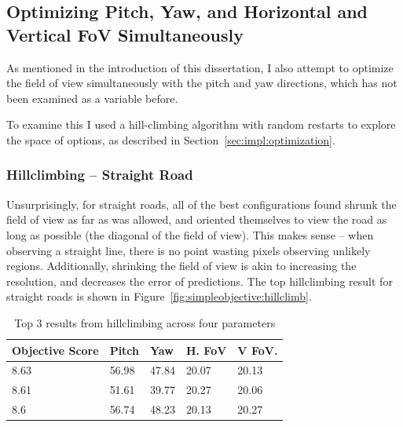 \documentclass[a4paper,12pt,twoside,openright]{report}
\begin{document}


\subsection{Optimizing Pitch, Yaw, and Horizontal and Vertical FoV Simultaneously}

As mentioned in the introduction of this dissertation, I also attempt
to optimize the field of view simultaneously with the pitch and yaw
directions, which has not been examined as a variable before.

To examine this I used a hill-climbing algorithm with random restarts
to explore the space of options, as described in Section~\ref{sec:impl:optimization}.

\subsubsection{Hillclimbing -- Straight Road}

Unsurprisingly, for straight roads, all of the best configurations found
shrunk the field of view as far as was allowed, and oriented themselves to
view the road as long as possible (the diagonal of the field of view). This makes sense -- 
when observing a straight line, there is no point wasting pixels
observing unlikely regions. Additionally, shrinking the field
of view is akin to increasing the resolution, and decreases
the error of predictions. The top hillclimbing result
for straight roads is shown in Figure~\ref{fig:simpleobjective:hillclimb}.

\begin{table}[htb]
    \centering
    \caption[Hillclimbing Top Scorers]{Top 3 results from hillclimbing across four parameters}
    \label{tab:simpleobjective:hillclimb}
    \begin{tabular}{@{}lllll@{}}
        \toprule
        Objective Score & Pitch & Yaw   & H. FoV & V FoV. \\ \midrule
        8.63            & 56.98 & 47.84 & 20.07  & 20.13  \\
        8.61            & 51.61 & 39.77 & 20.27  & 20.06  \\
        8.6             & 56.74 & 48.23 & 20.13  & 20.27  \\ \bottomrule
    \end{tabular}
\end{table}
\end{document}
